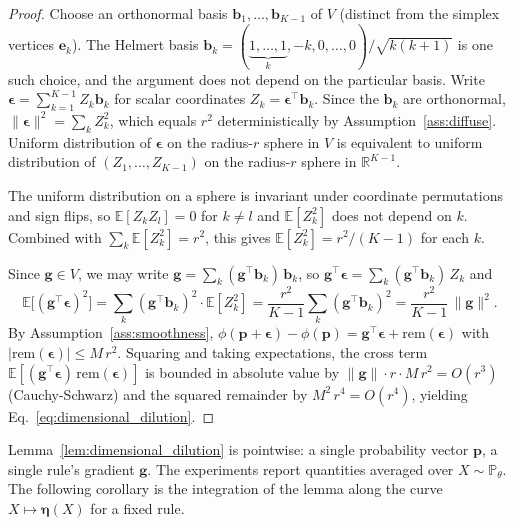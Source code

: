 \begin{proof}
    Choose an orthonormal basis $\mathbf{b}_1, \ldots, \mathbf{b}_{K-1}$ of $V$ (distinct from the simplex vertices $\mathbf{e}_k$). The Helmert basis $\mathbf{b}_k = (\underbrace{1, \ldots, 1}_{k}, -k, 0, \ldots, 0)/\sqrt{k(k+1)}$ is one such choice, and the argument does not depend on the particular basis. Write $\boldsymbol{\epsilon} = \sum_{k=1}^{K-1} Z_k \mathbf{b}_k$ for scalar coordinates $Z_k = \boldsymbol{\epsilon}^\top \mathbf{b}_k$. Since the $\mathbf{b}_k$ are orthonormal, $\|\boldsymbol{\epsilon}\|^2 = \sum_k Z_k^2$, which equals $r^2$ deterministically by Assumption~\ref{ass:diffuse}. Uniform distribution of $\boldsymbol{\epsilon}$ on the radius-$r$ sphere in $V$ is equivalent to uniform distribution of $(Z_1, \ldots, Z_{K-1})$ on the radius-$r$ sphere in $\mathbb{R}^{K-1}$.

    The uniform distribution on a sphere is invariant under coordinate permutations and sign flips, so $\mathbb{E}[Z_k Z_l] = 0$ for $k \neq l$ and $\mathbb{E}[Z_k^2]$ does not depend on $k$. Combined with $\sum_k \mathbb{E}[Z_k^2] = r^2$, this gives $\mathbb{E}[Z_k^2] = r^2/(K-1)$ for each $k$.

    Since $\mathbf{g} \in V$, we may write $\mathbf{g} = \sum_k (\mathbf{g}^\top \mathbf{b}_k)\,\mathbf{b}_k$, so $\mathbf{g}^\top \boldsymbol{\epsilon} = \sum_k (\mathbf{g}^\top \mathbf{b}_k)\,Z_k$ and
    \begin{equation*}
        \mathbb{E}\bigl[(\mathbf{g}^\top \boldsymbol{\epsilon})^2\bigr] = \sum_k (\mathbf{g}^\top \mathbf{b}_k)^2 \cdot \mathbb{E}[Z_k^2] = \frac{r^2}{K-1} \sum_k (\mathbf{g}^\top \mathbf{b}_k)^2 = \frac{r^2}{K-1}\,\|\mathbf{g}\|^2.
    \end{equation*}
    By Assumption~\ref{ass:smoothness}, $\phi(\mathbf{p} + \boldsymbol{\epsilon}) - \phi(\mathbf{p}) = \mathbf{g}^\top \boldsymbol{\epsilon} + \mathrm{rem}(\boldsymbol{\epsilon})$ with $|\mathrm{rem}(\boldsymbol{\epsilon})| \leq M\,r^2$. Squaring and taking expectations, the cross term $\mathbb{E}[(\mathbf{g}^\top \boldsymbol{\epsilon})\,\mathrm{rem}(\boldsymbol{\epsilon})]$ is bounded in absolute value by $\|\mathbf{g}\| \cdot r \cdot M\,r^2 = O(r^3)$ (Cauchy-Schwarz) and the squared remainder by $M^2\,r^4 = O(r^4)$, yielding Eq.~\eqref{eq:dimensional_dilution}.
\end{proof}

Lemma~\ref{lem:dimensional_dilution} is pointwise: a single probability vector $\mathbf{p}$, a single rule's gradient $\mathbf{g}$. The experiments report quantities averaged over $X \sim \mathbb{P}_\theta$. The following corollary is the integration of the lemma along the curve $X \mapsto \boldsymbol{\eta}(X)$ for a fixed rule.

